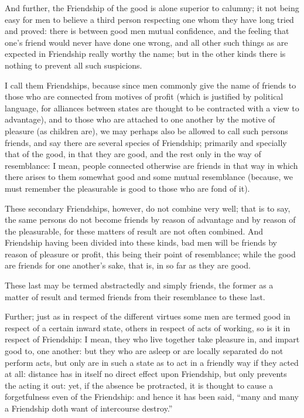 And further, the Friendship of the good is alone superior to calumny; it not
being easy for men to believe a third person respecting one whom they have long
tried and proved: there is between good men mutual confidence, and the feeling
that one’s friend would never have done one wrong, and all other such
things as are expected in Friendship really worthy the name; but in the other
kinds there is nothing to prevent all such suspicions.

I call them Friendships, because since men commonly give the name of friends to
those who are connected from motives of profit (which is justified by political
language, for alliances between states are thought to be contracted with a view
to advantage), and to those who are attached to one another by the motive of
pleasure (as children are), we may perhaps also be allowed to call such persons
friends, and say there are several species of Friendship; primarily and
specially that of the good, in that they are good, and the rest only in the way
of resemblance: I mean, people connected otherwise are friends in that way in
which there arises to them somewhat good and some mutual resemblance (because,
we must remember the pleasurable is good to those who are fond of it).

These secondary Friendships, however, do not combine very well; that is to say,
the same persons do not become friends by reason of advantage and by reason of
the pleasurable, for these matters of result are not often combined. And
Friendship having been divided into these kinds, bad men will be friends by
reason of pleasure or profit, this being their point of resemblance; while the
good are friends for one another’s sake, that is, in so far as they are
good.

These last may be termed abstractedly and simply friends, the former as a
matter of result and termed friends from their resemblance to these last.


Further; just as in respect of the different virtues some men are termed good
in respect of a certain inward state, others in respect of acts of working, so
is it in respect of Friendship: I mean, they who live together take pleasure
in, and impart good to, one another: but they who are asleep or are locally
separated do not perform acts, but only are in such a state as to act in a
friendly way if they acted at all: distance has in itself no direct effect upon
Friendship, but only prevents the acting it out: yet, if the absence be
protracted, it is thought to cause a forgetfulness even of the Friendship: and
hence it has been said, “many and many a Friendship doth want of
intercourse destroy.”

